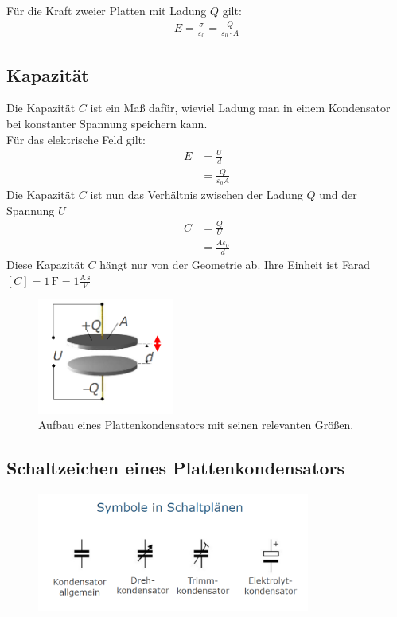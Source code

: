 \documentclass{article}
\begin{document}
\noindent Für die Kraft zweier Platten mit Ladung $Q$ gilt:
\begin{align}
    E=\frac{\sigma}{\varepsilon_0}=\frac{Q}{\varepsilon_0\cdot A}
\end{align}

\subsection{Kapazität}
Die Kapazität $C$ ist ein Maß dafür, wieviel Ladung man in einem Kondensator bei konstanter Spannung speichern kann.\\
Für das elektrische Feld gilt:
\begin{align}
    E&=\frac{U}{d}\\
    &=\frac{Q}{\varepsilon_0A}
\end{align}
Die Kapazität $C$ ist nun das Verhältnis zwischen der Ladung $Q$ und der Spannung $U$
\begin{align}
    C&=\frac{Q}{U}\\
    &=\frac{A\varepsilon_0}{d}
\end{align}
Diese Kapazität $C$ hängt nur von der Geometrie ab.
Ihre Einheit ist Farad $[C]=1\,\mathrm{F}=1\frac{\mathrm{A\,s}}{V}$
\begin{figure}[H]
    \centering
    \includegraphics[width=0.40\textwidth]{aufbau plattenkondensator.png}
    \caption{Aufbau eines Plattenkondensators mit seinen relevanten Größen.}
\end{figure}

\subsection{Schaltzeichen eines Plattenkondensators}
\begin{figure}[H]
    \centering
    \includegraphics[width=0.8\textwidth]{Plattenkondensator schaltplan.png}
\end{figure}
\end{document}
